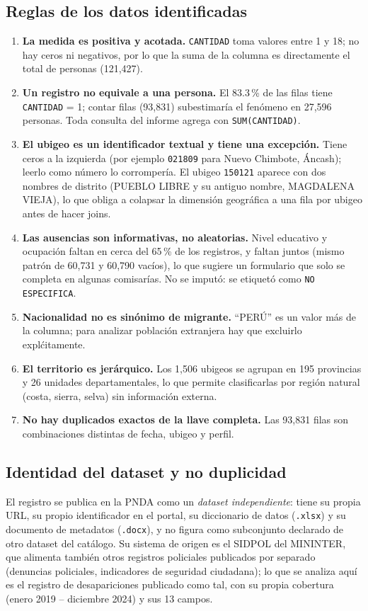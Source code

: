\subsection{Reglas de los datos identificadas}
\begin{enumerate}
  \item \textbf{La medida es positiva y acotada.} \texttt{CANTIDAD} toma valores entre 1 y 18; no
        hay ceros ni negativos, por lo que la suma de la columna es directamente el total de
        personas (121,427).
  \item \textbf{Un registro no equivale a una persona.} El 83.3\,\% de las filas tiene
        \texttt{CANTIDAD} = 1; contar filas (93,831) subestimar\'ia el fen\'omeno en 27,596
        personas. Toda consulta del informe agrega con \texttt{SUM(CANTIDAD)}.
  \item \textbf{El ubigeo es un identificador textual y tiene una excepci\'on.} Tiene ceros a la
        izquierda (por ejemplo \texttt{021809} para Nuevo Chimbote, \'Ancash); leerlo como
        n\'umero lo corromper\'ia. El ubigeo \texttt{150121} aparece con dos nombres de distrito
        (PUEBLO LIBRE y su antiguo nombre, MAGDALENA VIEJA), lo que obliga a colapsar la
        dimensi\'on geogr\'afica a una fila por ubigeo antes de hacer joins.
  \item \textbf{Las ausencias son informativas, no aleatorias.} Nivel educativo y ocupaci\'on
        faltan en cerca del 65\,\% de los registros, y faltan juntos (mismo patr\'on de 60,731 y
        60,790 vac\'ios), lo que sugiere un formulario que solo se completa en algunas
        comisar\'ias. No se imput\'o: se etiquet\'o como \texttt{NO ESPECIFICA}.
  \item \textbf{Nacionalidad no es sin\'onimo de migrante.} ``PER\'U'' es un valor m\'as de la
        columna; para analizar poblaci\'on extranjera hay que excluirlo expl\'citamente.
  \item \textbf{El territorio es jer\'arquico.} Los 1,506 ubigeos se agrupan en 195 provincias y
        26 unidades departamentales, lo que permite clasificarlas por regi\'on natural (costa,
        sierra, selva) sin informaci\'on externa.
  \item \textbf{No hay duplicados exactos de la llave completa.} Las 93,831 filas son
        combinaciones distintas de fecha, ubigeo y perfil.
\end{enumerate}

\subsection{Identidad del dataset y no duplicidad}
El registro se publica en la PNDA como un \emph{dataset independiente}: tiene su propia URL,
su propio identificador en el portal, su diccionario de datos (\texttt{.xlsx}) y su documento de
metadatos (\texttt{.docx}), y no figura como subconjunto declarado de otro dataset del cat\'alogo.
Su sistema de origen es el SIDPOL del MININTER, que alimenta tambi\'en otros registros policiales
publicados por separado (denuncias policiales, indicadores de seguridad ciudadana); lo que se
analiza aqu\'i es el registro de desapariciones publicado como tal, con su propia cobertura
(enero 2019 -- diciembre 2024) y sus 13 campos.

